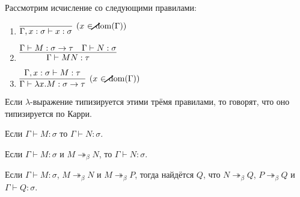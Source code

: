 \begin{definition}
    Рассмотрим исчисление со следующими правилами:
    \begin{enumerate}
        \item $\infer[(x\ \cancel{\in}\ \mathrm{dom}(\Gamma))]
            {\Gamma, x:\sigma \vdash x:\sigma}
            {}$
        \item $\infer[]
            {\Gamma \vdash M N : \tau}
            {\Gamma \vdash M:\sigma \rightarrow \tau & \Gamma \vdash N:\sigma}$
        \item $\infer[(x\ \cancel{\in}\ \mathrm{dom}(\Gamma))]
            {\Gamma \vdash \lambda x . M : \sigma \rightarrow \tau}
            {\Gamma, x : \sigma \vdash M : \tau}$
    \end{enumerate}


    Если $\lambda$-выражение типизируется этими трёмя правилами, то говорят, что оно типизируется по Карри.
\end{definition}

\begin{lemma}
    Если $\Gamma \vdash M : \sigma$ то $\Gamma \vdash N : \sigma$.
\end{lemma}

\begin{corollary}
    Если $\Gamma \vdash M : \sigma$ и $M \twoheadrightarrow_{\beta}N$, то $\Gamma \vdash N : \sigma$.
\end{corollary}

\begin{theorem}
    Если $\Gamma \vdash M : \sigma$, $M \twoheadrightarrow_{\beta} N$ и $M \twoheadrightarrow_{\beta} P$, тогда найдётся $Q$, что
    $N \twoheadrightarrow_{\beta} Q$, $P \twoheadrightarrow_{\beta} Q$ и $\Gamma \vdash Q : \sigma$.
\end{theorem}

